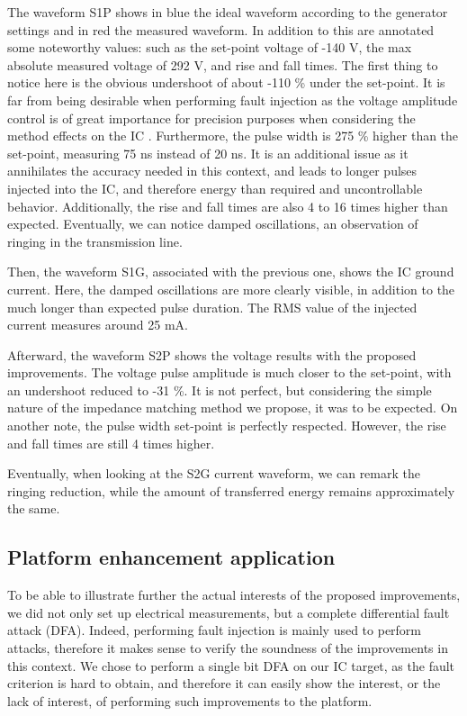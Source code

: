 		The waveform S1P shows in blue the ideal waveform according to the generator settings and in red the measured waveform.
		In addition to this are annotated some noteworthy values: such as the set-point voltage of -140 V, the max absolute measured voltage of 292 V, and rise and fall times.
		The first thing to notice here is the obvious undershoot of about -110 \% under the set-point.
		It is far from being desirable when performing fault injection as the voltage amplitude control is of great importance for precision purposes when considering the method effects on the IC \cite{mybbifdtc2023}.
		Furthermore, the pulse width is 275 \% higher than the set-point, measuring 75 ns instead of 20 ns.
		It is an additional issue as it annihilates the accuracy needed in this context, and leads to longer pulses injected into the IC, and therefore energy than required and uncontrollable behavior.
		Additionally, the rise and fall times are also 4 to 16 times higher than expected.
		Eventually, we can notice damped oscillations, an observation of ringing in the transmission line.

		Then, the waveform S1G, associated with the previous one, shows the IC ground current.
		Here, the damped oscillations are more clearly visible, in addition to the much longer than expected pulse duration.
		The RMS value of the injected current measures around 25 mA.

		Afterward, the waveform S2P shows the voltage results with the proposed improvements.
		The voltage pulse amplitude is much closer to the set-point, with an undershoot reduced to -31 \%.
		It is not perfect, but considering the simple nature of the impedance matching method we propose, it was to be expected.
		On another note, the pulse width set-point is perfectly respected.
		However, the rise and fall times are still 4 times higher.
		
		Eventually, when looking at the S2G current waveform, we can remark the ringing reduction, while the amount of transferred energy remains approximately the same.

	\subsection{Platform enhancement application}
		To be able to illustrate further the actual interests of the proposed improvements, we did not only set up electrical measurements, but a complete differential fault attack (DFA).
		Indeed, performing fault injection is mainly used to perform attacks, therefore it makes sense to verify the soundness of the improvements in this context.
		We chose to perform a single bit DFA on our IC target, as the fault criterion is hard to obtain, and therefore it can easily show the interest, or the lack of interest, of performing such improvements to the platform.
		
